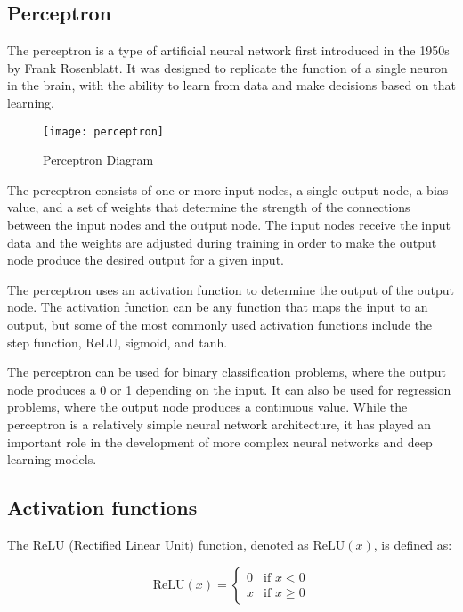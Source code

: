 \subsection{Perceptron}

The perceptron \cite{rosenblatt1958perceptron} is a type of artificial neural network first introduced in the 1950s by Frank Rosenblatt.
It was designed to replicate the function of a single neuron in the brain, with the ability to learn from data and make decisions based on that learning.

\begin{figure}[H]
  \centering
  \texttt{[image: perceptron]}
  \caption{Perceptron Diagram \cite{Bhattacharyya}}
\end{figure}

The perceptron consists of one or more input nodes, a single output node, a bias value, and a set of weights that determine the strength of the connections between the input nodes and the output node.
The input nodes receive the input data and the weights are adjusted during training in order to make the output node produce the desired output for a given input.

The perceptron uses an activation function to determine the output of the output node. 
The activation function can be any function that maps the input to an output, but some of the most commonly used activation functions include the step function, ReLU, sigmoid, and tanh.

The perceptron can be used for binary classification problems, where the output node produces a 0 or 1 depending on the input.
It can also be used for regression problems, where the output node produces a continuous value. 
While the perceptron is a relatively simple neural network architecture, it has played an important role in the development of more complex neural networks and deep learning models.

\subsection{Activation functions}

The ReLU (Rectified Linear Unit) function, denoted as $\text{ReLU}(x)$, is defined as:

\begin{equation}
  \text{ReLU}(x) = \begin{cases}
    0 & \text{if } x < 0 \\
    x & \text{if } x \geq 0
  \end{cases}
\end{equation}

